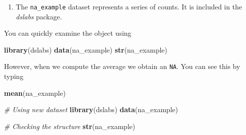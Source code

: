 \documentclass[
]{article}
\newenvironment{Shaded}{\begin{snugshade}}{\end{snugshade}}
\newcommand{\CommentTok}[1]{\textcolor[rgb]{0.56,0.35,0.01}{\textit{#1}}}
\newcommand{\DataTypeTok}[1]{\textcolor[rgb]{0.13,0.29,0.53}{#1}}
\newcommand{\KeywordTok}[1]{\textcolor[rgb]{0.13,0.29,0.53}{\textbf{#1}}}
\newcommand{\NormalTok}[1]{#1}
\newcommand{\OperatorTok}[1]{\textcolor[rgb]{0.81,0.36,0.00}{\textbf{#1}}}
\newcommand{\StringTok}[1]{\textcolor[rgb]{0.31,0.60,0.02}{#1}}
\providecommand{\tightlist}{%
  \setlength{\itemsep}{0pt}\setlength{\parskip}{0pt}}
\begin{document}
\begin{Shaded}
\end{Shaded}

\begin{enumerate}
\def\labelenumi{\arabic{enumi}.}
\setcounter{enumi}{6}
\tightlist
\item
  The \texttt{na\_example} dataset represents a series of counts. It is
  included in the \emph{dslabs} package.
\end{enumerate}

You can quickly examine the object using

\begin{Shaded}
\begin{Highlighting}[]
\KeywordTok{library}\NormalTok{(dslabs)}
\KeywordTok{data}\NormalTok{(na_example)}
\KeywordTok{str}\NormalTok{(na_example)}
\end{Highlighting}
\end{Shaded}

However, when we compute the average we obtain an \texttt{NA}. You can
see this by typing

\begin{Shaded}
\begin{Highlighting}[]
\KeywordTok{mean}\NormalTok{(na_example)}
\end{Highlighting}
\end{Shaded}

\begin{Shaded}
\begin{Highlighting}[]
\CommentTok{# Using new dataset }
\KeywordTok{library}\NormalTok{(dslabs)}
\KeywordTok{data}\NormalTok{(na_example)}

\CommentTok{# Checking the structure }
\KeywordTok{str}\NormalTok{(na_example)}
\end{Highlighting}
\end{Shaded}
\end{document}
